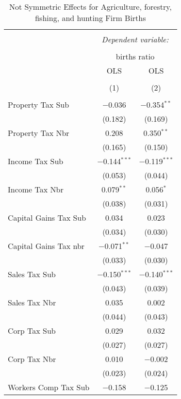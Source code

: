 
\begin{table}[!htbp] \centering 
  \caption{Not Symmetric Effects for  Agriculture, forestry, fishing, and hunting Firm Births} 
  \label{11noequality} 
\footnotesize 
\begin{tabular}{@{\extracolsep{5pt}}lcc} 
\\[-1.8ex]\hline 
\hline \\[-1.8ex] 
 & \multicolumn{2}{c}{\textit{Dependent variable:}} \\ 
\cline{2-3} 
\\[-1.8ex] & \multicolumn{2}{c}{births ratio} \\ 
 & OLS & OLS \\ 
\\[-1.8ex] & (1) & (2)\\ 
\hline \\[-1.8ex] 
 Property Tax Sub & $-$0.036 & $-$0.354$^{**}$ \\ 
  & (0.182) & (0.169) \\ 
  Property Tax Nbr & 0.208 & 0.350$^{**}$ \\ 
  & (0.165) & (0.150) \\ 
  Income Tax Sub & $-$0.144$^{***}$ & $-$0.119$^{***}$ \\ 
  & (0.053) & (0.044) \\ 
  Income Tax Nbr & 0.079$^{**}$ & 0.056$^{*}$ \\ 
  & (0.038) & (0.031) \\ 
  Capital Gains Tax Sub & 0.034 & 0.023 \\ 
  & (0.034) & (0.030) \\ 
  Capital Gains Tax nbr & $-$0.071$^{**}$ & $-$0.047 \\ 
  & (0.033) & (0.030) \\ 
  Sales Tax Sub & $-$0.150$^{***}$ & $-$0.140$^{***}$ \\ 
  & (0.043) & (0.039) \\ 
  Sales Tax Nbr & 0.035 & 0.002 \\ 
  & (0.044) & (0.043) \\ 
  Corp Tax Sub & 0.029 & 0.032 \\ 
  & (0.027) & (0.027) \\ 
  Corp Tax Nbr & 0.010 & $-$0.002 \\ 
  & (0.023) & (0.024) \\ 
  Workers Comp Tax Sub & $-$0.158 & $-$0.125 \\ 

\end{tabular}
\end{table}
